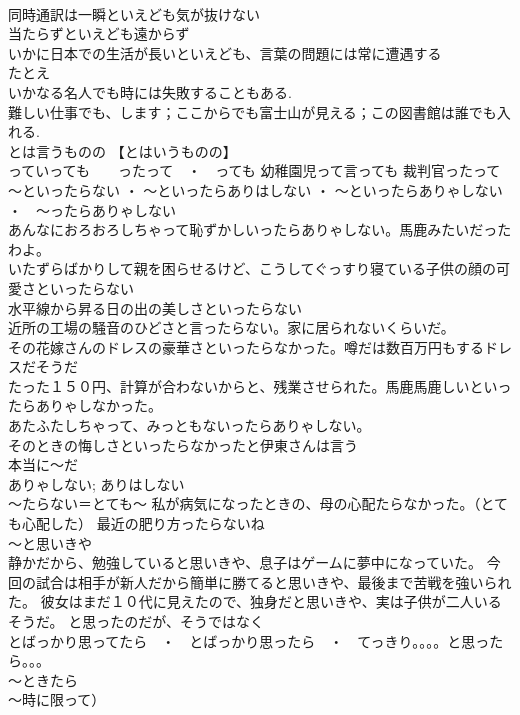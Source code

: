 \documentclass[8pt]{extreport}
\begin{document}
\begin{CJK}{UTF8}{min}
\\	同時通訳は一瞬といえども気が抜けない 
\\	当たらずといえども遠からず 
\\	いかに日本での生活が長いといえども、言葉の問題には常に遭遇する 
\\	たとえ 
\\	いかなる名人でも時には失敗することもある. 
\\	難しい仕事でも、します；ここからでも富士山が見える；この図書館は誰でも入れる.
\\	とは言うものの 【とはいうものの】 
\\	っていっても　　ったって　・　っても 幼稚園児って言っても 裁判官ったって
\\	～といったらない ・ ～といったらありはしない ・ ～といったらありゃしない ・　～ったらありゃしない
\\	あんなにおろおろしちゃって恥ずかしいったらありゃしない。馬鹿みたいだったわよ。
\\	いたずらばかりして親を困らせるけど、こうしてぐっすり寝ている子供の顔の可愛さといったらない 
\\	水平線から昇る日の出の美しさといったらない 
\\	近所の工場の騒音のひどさと言ったらない。家に居られないくらいだ。 
\\	その花嫁さんのドレスの豪華さといったらなかった。噂だは数百万円もするドレスだそうだ 
\\	たった１５０円、計算が合わないからと、残業させられた。馬鹿馬鹿しいといったらありゃしなかった。 
\\	あたふたしちゃって、みっともないったらありゃしない。
\\	そのときの悔しさといったらなかったと伊東さんは言う　
\\	本当に～だ 
\\	ありゃしない; ありはしない 
\\	～たらない＝とても～ 私が病気になったときの、母の心配たらなかった。（とても心配した） 最近の肥り方ったらないね 
\\	～と思いきや	
\\	静かだから、勉強していると思いきや、息子はゲームに夢中になっていた。 今回の試合は相手が新人だから簡単に勝てると思いきや、最後まで苦戦を強いられた。 彼女はまだ１０代に見えたので、独身だと思いきや、実は子供が二人いるそうだ。	と思ったのだが、そうではなく 
\\	とばっかり思ってたら　・　とばっかり思ったら　・　てっきり。。。。と思ったら。。。
\\	～ときたら 
\\	～時に限って）	

\end{CJK}
\end{document}
